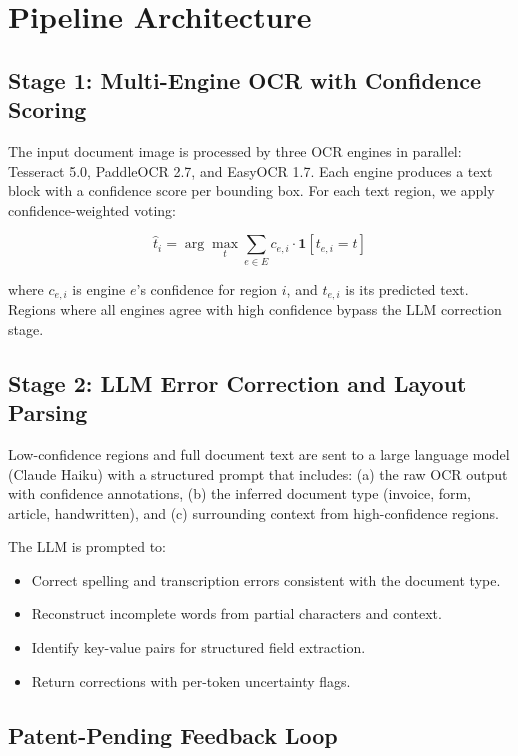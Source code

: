 \documentclass[conference]{IEEEtran}
\begin{document}
\section{Pipeline Architecture}

\subsection{Stage 1: Multi-Engine OCR with Confidence Scoring}

The input document image is processed by three OCR engines in parallel: Tesseract 5.0, PaddleOCR 2.7, and EasyOCR 1.7. Each engine produces a text block with a confidence score per bounding box. For each text region, we apply confidence-weighted voting:

\begin{equation}
\hat{t}_i = \arg\max_{t} \sum_{e \in E} c_{e,i} \cdot \mathbf{1}[t_{e,i} = t]
\end{equation}

where $c_{e,i}$ is engine $e$'s confidence for region $i$, and $t_{e,i}$ is its predicted text. Regions where all engines agree with high confidence bypass the LLM correction stage.

\subsection{Stage 2: LLM Error Correction and Layout Parsing}

Low-confidence regions and full document text are sent to a large language model (Claude Haiku) with a structured prompt that includes: (a) the raw OCR output with confidence annotations, (b) the inferred document type (invoice, form, article, handwritten), and (c) surrounding context from high-confidence regions.

The LLM is prompted to:
\begin{itemize}
\item Correct spelling and transcription errors consistent with the document type.
\item Reconstruct incomplete words from partial characters and context.
\item Identify key-value pairs for structured field extraction.
\item Return corrections with per-token uncertainty flags.
\end{itemize}

\subsection{Patent-Pending Feedback Loop}
\end{document}
